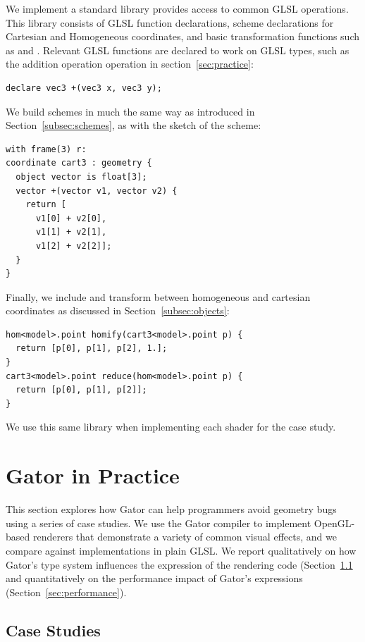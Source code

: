 \documentclass[../main.tex]{subfiles}
\begin{document}
{We implement a standard library provides access to common GLSL operations.  This library consists of GLSL function declarations, scheme declarations for Cartesian and Homogeneous coordinates, and basic transformation functions such as  and .  Relevant GLSL functions are declared to work on GLSL types, such as the addition operation operation in section~\ref{sec:practice}:
%
\begin{lstlisting}
declare vec3 +(vec3 x, vec3 y);
\end{lstlisting}
%
We build schemes in much the same way as introduced in Section~\ref{subsec:schemes}, as with the sketch of the  scheme:
%
\begin{lstlisting}
with frame(3) r:
coordinate cart3 : geometry {
  object vector is float[3];
  vector +(vector v1, vector v2) {
	return [
	  v1[0] + v2[0], 
	  v1[1] + v2[1], 
	  v1[2] + v2[2]];
  }
}
\end{lstlisting}
%
Finally, we include  and  transform between homogeneous and cartesian coordinates as discussed in Section~\ref{subsec:objects}:
%
\begin{lstlisting}
hom<model>.point homify(cart3<model>.point p) {
  return [p[0], p[1], p[2], 1.]; 
}
cart3<model>.point reduce(hom<model>.point p) {
  return [p[0], p[1], p[2]]; 
}
\end{lstlisting}
%
We use this same library when implementing each shader for the case study.
\section{Gator in Practice}
\label{sec:inpractice}

This section explores how Gator can help programmers avoid geometry bugs using a series of case studies.
We use the Gator compiler to implement OpenGL-based renderers that demonstrate a variety of common visual effects,
and we compare against implementations in plain GLSL.
We report qualitatively on how Gator's type system influences the expression of the rendering code (Section~\ref{sec:casestudies} and quantitatively on the performance impact of Gator's  expressions (Section~\ref{sec:performance}).

\subsection{Case Studies}
\label{sec:casestudies}

}
\end{document}
